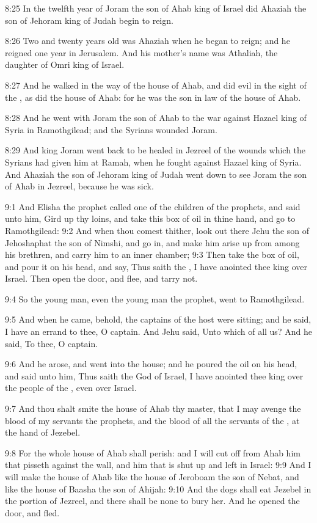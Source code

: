 8:25 In the twelfth year of Joram the son of Ahab king of Israel did
Ahaziah the son of Jehoram king of Judah begin to reign.

8:26 Two and twenty years old was Ahaziah when he began to reign; and
he reigned one year in Jerusalem. And his mother's name was Athaliah,
the daughter of Omri king of Israel.

8:27 And he walked in the way of the house of Ahab, and did evil in
the sight of the \LORD, as did the house of Ahab: for he was the son in
law of the house of Ahab.

8:28 And he went with Joram the son of Ahab to the war against Hazael
king of Syria in Ramothgilead; and the Syrians wounded Joram.

8:29 And king Joram went back to be healed in Jezreel of the wounds
which the Syrians had given him at Ramah, when he fought against
Hazael king of Syria. And Ahaziah the son of Jehoram king of Judah
went down to see Joram the son of Ahab in Jezreel, because he was
sick.

9:1 And Elisha the prophet called one of the children of the prophets,
and said unto him, Gird up thy loins, and take this box of oil in
thine hand, and go to Ramothgilead: 9:2 And when thou comest thither,
look out there Jehu the son of Jehoshaphat the son of Nimshi, and go
in, and make him arise up from among his brethren, and carry him to an
inner chamber; 9:3 Then take the box of oil, and pour it on his head,
and say, Thus saith the \LORD, I have anointed thee king over Israel.
Then open the door, and flee, and tarry not.

9:4 So the young man, even the young man the prophet, went to
Ramothgilead.

9:5 And when he came, behold, the captains of the host were sitting;
and he said, I have an errand to thee, O captain. And Jehu said, Unto
which of all us? And he said, To thee, O captain.

9:6 And he arose, and went into the house; and he poured the oil on
his head, and said unto him, Thus saith the \LORD God of Israel, I have
anointed thee king over the people of the \LORD, even over Israel.

9:7 And thou shalt smite the house of Ahab thy master, that I may
avenge the blood of my servants the prophets, and the blood of all the
servants of the \LORD, at the hand of Jezebel.

9:8 For the whole house of Ahab shall perish: and I will cut off from
Ahab him that pisseth against the wall, and him that is shut up and
left in Israel: 9:9 And I will make the house of Ahab like the house
of Jeroboam the son of Nebat, and like the house of Baasha the son of
Ahijah: 9:10 And the dogs shall eat Jezebel in the portion of Jezreel,
and there shall be none to bury her. And he opened the door, and fled.


